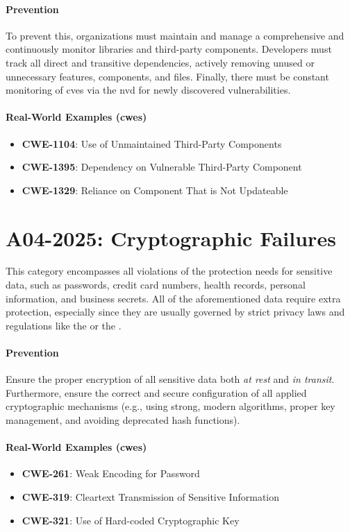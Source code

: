 \paragraph{Prevention} To prevent this, organizations must maintain and manage a comprehensive  and continuously monitor libraries and third-party components. Developers must track all direct and transitive dependencies, actively removing unused or unnecessary features, components, and files. Finally, there must be constant monitoring of \glspl{cve} via the \gls{nvd} for newly discovered vulnerabilities.

\paragraph{Real-World Examples (\glspl{cwe})}
\begin{itemize}
    \item \textbf{CWE-1104}: Use of Unmaintained Third-Party Components
    \item \textbf{CWE-1395}: Dependency on Vulnerable Third-Party Component
    \item \textbf{CWE-1329}: Reliance on Component That is Not Updateable
\end{itemize}

\section{A04-2025: Cryptographic Failures}
This category encompasses all violations of the protection needs for sensitive data, such as passwords, credit card numbers, health records, personal information, and business secrets. All of the aforementioned data require extra protection, especially since they are usually governed by strict privacy laws and regulations like the  or the .

\paragraph{Prevention} Ensure the proper encryption of all sensitive data both \textit{at rest} and \textit{in transit}. Furthermore, ensure the correct and secure configuration of all applied cryptographic mechanisms (e.g., using strong, modern algorithms, proper key management, and avoiding deprecated hash functions).

\paragraph{Real-World Examples (\glspl{cwe})}
\begin{itemize}
    \item \textbf{CWE-261}: Weak Encoding for Password
    \item \textbf{CWE-319}: Cleartext Transmission of Sensitive Information
    \item \textbf{CWE-321}: Use of Hard-coded Cryptographic Key
\end{itemize}

